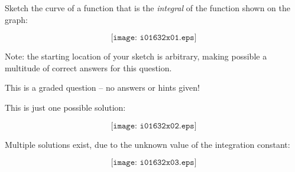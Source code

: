 

Sketch the curve of a function that is the {\it integral} of the function shown on the graph:

$$\texttt{[image: i01632x01.eps]}$$

Note: the starting location of your sketch is arbitrary, making possible a multitude of correct answers for this question.

\vfil

\eject






This is a graded question -- no answers or hints given!







This is just one possible solution:

$$\texttt{[image: i01632x02.eps]}$$

Multiple solutions exist, due to the unknown value of the integration constant:

$$\texttt{[image: i01632x03.eps]}$$




